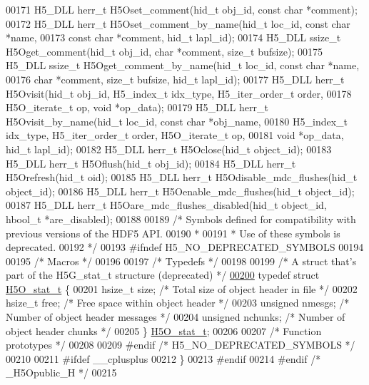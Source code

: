 \begin{DoxyCode}
00171 H5\_DLL herr\_t H5Oset\_comment(hid\_t obj\_id, \textcolor{keyword}{const} \textcolor{keywordtype}{char} *comment);
00172 H5\_DLL herr\_t H5Oset\_comment\_by\_name(hid\_t loc\_id, \textcolor{keyword}{const} \textcolor{keywordtype}{char} *name,
00173     \textcolor{keyword}{const} \textcolor{keywordtype}{char} *comment, hid\_t lapl\_id);
00174 H5\_DLL ssize\_t H5Oget\_comment(hid\_t obj\_id, \textcolor{keywordtype}{char} *comment, \textcolor{keywordtype}{size\_t} bufsize);
00175 H5\_DLL ssize\_t H5Oget\_comment\_by\_name(hid\_t loc\_id, \textcolor{keyword}{const} \textcolor{keywordtype}{char} *name,
00176     \textcolor{keywordtype}{char} *comment, \textcolor{keywordtype}{size\_t} bufsize, hid\_t lapl\_id);
00177 H5\_DLL herr\_t H5Ovisit(hid\_t obj\_id, H5\_index\_t idx\_type, H5\_iter\_order\_t order,
00178     H5O\_iterate\_t op, \textcolor{keywordtype}{void} *op\_data);
00179 H5\_DLL herr\_t H5Ovisit\_by\_name(hid\_t loc\_id, \textcolor{keyword}{const} \textcolor{keywordtype}{char} *obj\_name,
00180     H5\_index\_t idx\_type, H5\_iter\_order\_t order, H5O\_iterate\_t op,
00181     \textcolor{keywordtype}{void} *op\_data, hid\_t lapl\_id);
00182 H5\_DLL herr\_t H5Oclose(hid\_t object\_id);
00183 H5\_DLL herr\_t H5Oflush(hid\_t obj\_id);
00184 H5\_DLL herr\_t H5Orefresh(hid\_t oid);
00185 H5\_DLL herr\_t H5Odisable\_mdc\_flushes(hid\_t object\_id);
00186 H5\_DLL herr\_t H5Oenable\_mdc\_flushes(hid\_t object\_id);
00187 H5\_DLL herr\_t H5Oare\_mdc\_flushes\_disabled(hid\_t object\_id, hbool\_t *are\_disabled);
00188 
00189 \textcolor{comment}{/* Symbols defined for compatibility with previous versions of the HDF5 API.}
00190 \textcolor{comment}{ *}
00191 \textcolor{comment}{ * Use of these symbols is deprecated.}
00192 \textcolor{comment}{ */}
00193 \textcolor{preprocessor}{#ifndef H5\_NO\_DEPRECATED\_SYMBOLS}
00194 
00195 \textcolor{comment}{/* Macros */}
00196 
00197 \textcolor{comment}{/* Typedefs */}
00198 
00199 \textcolor{comment}{/* A struct that's part of the H5G\_stat\_t structure (deprecated) */}
\hyperlink{struct_h5_o__stat__t}{00200} \textcolor{keyword}{typedef} \textcolor{keyword}{struct }\hyperlink{struct_h5_o__stat__t}{H5O\_stat\_t} \{
00201     hsize\_t size;               \textcolor{comment}{/* Total size of object header in file */}
00202     hsize\_t free;               \textcolor{comment}{/* Free space within object header */}
00203     \textcolor{keywordtype}{unsigned} nmesgs;            \textcolor{comment}{/* Number of object header messages */}
00204     \textcolor{keywordtype}{unsigned} nchunks;           \textcolor{comment}{/* Number of object header chunks */}
00205 \} \hyperlink{struct_h5_o__stat__t}{H5O\_stat\_t};
00206 
00207 \textcolor{comment}{/* Function prototypes */}
00208 
00209 \textcolor{preprocessor}{#endif }\textcolor{comment}{/* H5\_NO\_DEPRECATED\_SYMBOLS */}\textcolor{preprocessor}{}
00210 
00211 \textcolor{preprocessor}{#ifdef \_\_cplusplus}
00212 \}
00213 \textcolor{preprocessor}{#endif}
00214 \textcolor{preprocessor}{#endif }\textcolor{comment}{/* \_H5Opublic\_H */}\textcolor{preprocessor}{}
00215 
\end{DoxyCode}
